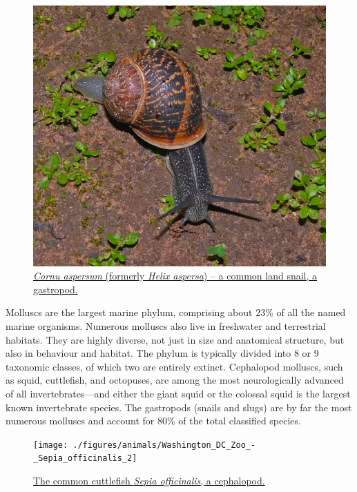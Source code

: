 \begin{figure}

{\centering \includegraphics[width=0.7\linewidth]{./figures/animals/Snail-wiki-120-Zachi-Evenor} 

}

\caption{\href{https://commons.wikimedia.org/wiki/File:Snail-wiki-120-Zachi-Evenor.jpg}{\emph{Cornu aspersum} (formerly \emph{Helix aspersa}) -- a common land snail, a gastropod.}}\label{fig:snail}
\end{figure}

Molluscs are the largest marine phylum, comprising about 23\% of all the named marine organisms. Numerous molluscs also live in freshwater and terrestrial habitats. They are highly diverse, not just in size and anatomical structure, but also in behaviour and habitat. The phylum is typically divided into 8 or 9 taxonomic classes, of which two are entirely extinct. Cephalopod molluscs, such as squid, cuttlefish, and octopuses, are among the most neurologically advanced of all invertebrates---and either the giant squid or the colossal squid is the largest known invertebrate species. The gastropods (snails and slugs) are by far the most numerous molluscs and account for 80\% of the total classified species.



\begin{figure}

{\centering \texttt{[image: ./figures/animals/Washington\_DC\_Zoo\_-\_Sepia\_officinalis\_2]} 

}

\caption{\href{https://commons.wikimedia.org/wiki/File:Washington_DC_Zoo_-_Sepia_officinalis_2.jpg}{The common cuttlefish \emph{Sepia officinalis}, a cephalopod.}}\label{fig:cuttlefish}
\end{figure}


